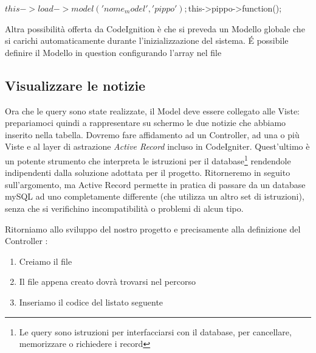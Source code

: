 \begin{code}
$this->load->model('nome_model', 'pippo');

$this->pippo->function();
\end{code}

Altra possibilità offerta da CodeIgnition è che si preveda un Modello globale che si carichi automaticamente durante l'inizializzazione del sistema. \'E possibile definire il Modello in question configurando l'array  nel file 

\subsection{Visualizzare le notizie}
Ora che le query sono state realizzate, il Model deve essere collegato alle Viste: prepariamoci quindi a rappresentare su schermo le due notizie che abbiamo inserito nella tabella. Dovremo fare affidamento ad un Controller, ad una o più Viste e al layer di astrazione \emph{Active Record} incluso in CodeIgniter. Quest'ultimo è un potente strumento che interpreta le istruzioni per il database\footnote{Le query sono istruzioni per interfacciarsi con il database, per cancellare, memorizzare o richiedere i record} rendendole indipendenti dalla soluzione adottata per il progetto. Ritorneremo in seguito sull'argomento, ma Active Record permette in pratica di passare da un database mySQL ad uno completamente differente (che utilizza un altro set di istruzioni), senza che si verifichino incompatibilità o problemi di alcun tipo.

Ritorniamo allo sviluppo del nostro progetto e precisamente alla definizione del Controller :

\begin{enumerate}
\item Creiamo il file  
\item Il file appena creato dovrà trovarsi nel percorso 
\item Inseriamo il codice del listato seguente
\end{enumerate}

\label{list:classnews}

